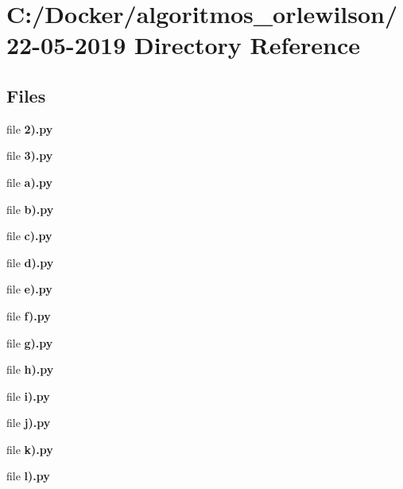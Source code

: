 \section{C\+:/\+Docker/algoritmos\+\_\+orlewilson/22-\/05-\/2019 Directory Reference}
\label{dir_95160c34c8567b18bb910c4ce49b9958}
\subsection*{Files}
\begin{DoxyCompactItemize}
\item 
file \textbf{ 2).\+py}
\item 
file \textbf{ 3).\+py}
\item 
file \textbf{ a).\+py}
\item 
file \textbf{ b).\+py}
\item 
file \textbf{ c).\+py}
\item 
file \textbf{ d).\+py}
\item 
file \textbf{ e).\+py}
\item 
file \textbf{ f).\+py}
\item 
file \textbf{ g).\+py}
\item 
file \textbf{ h).\+py}
\item 
file \textbf{ i).\+py}
\item 
file \textbf{ j).\+py}
\item 
file \textbf{ k).\+py}
\item 
file \textbf{ l).\+py}
\end{DoxyCompactItemize}
